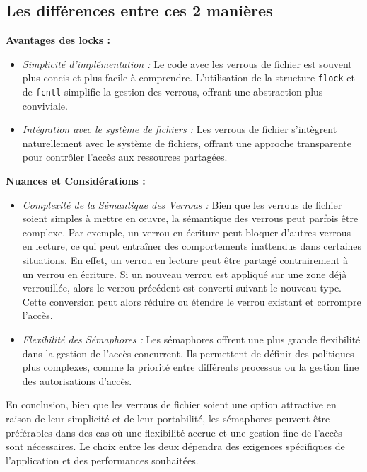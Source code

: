 \subsection{Les différences entre ces 2 manières}
\textbf{Avantages des locks :}

\begin{itemize}
\item \textit{Simplicité d'implémentation :} Le code avec les verrous de fichier est souvent plus concis et plus facile à comprendre. L'utilisation de la structure \texttt{flock} et de \texttt{fcntl} simplifie la gestion des verrous, offrant une abstraction plus conviviale.

\item \textit{Intégration avec le système de fichiers :} Les verrous de fichier s'intègrent naturellement avec le système de fichiers, offrant une approche transparente pour contrôler l'accès aux ressources partagées.
\end{itemize}

\textbf{Nuances et Considérations :}

\begin{itemize}
\item \textit{Complexité de la Sémantique des Verrous :} Bien que les verrous de fichier soient simples à mettre en œuvre, la sémantique des verrous peut parfois être complexe. Par exemple, un verrou en écriture peut bloquer d'autres verrous en lecture, ce qui peut entraîner des comportements inattendus dans certaines situations. En effet, un verrou en lecture peut être partagé contrairement à un verrou en écriture. Si un nouveau verrou est appliqué sur une zone déjà verrouillée, alors le verrou précédent est converti suivant le nouveau type. Cette conversion peut alors réduire ou étendre le verrou existant et corrompre l'accès.
\item \textit{Flexibilité des Sémaphores :} Les sémaphores offrent une plus grande flexibilité dans la gestion de l'accès concurrent. Ils permettent de définir des politiques plus complexes, comme la priorité entre différents processus ou la gestion fine des autorisations d'accès.
\end{itemize}

En conclusion, bien que les verrous de fichier soient une option attractive en raison de leur simplicité et de leur portabilité, les sémaphores peuvent être préférables dans des cas où une flexibilité accrue et une gestion fine de l'accès sont nécessaires. Le choix entre les deux dépendra des exigences spécifiques de l'application et des performances souhaitées.